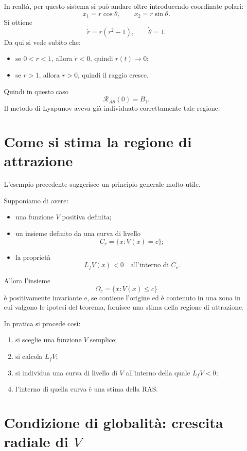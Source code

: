 In realtà, per questo sistema si può andare oltre introducendo coordinate polari:
\[
x_1=r\cos\theta,
\qquad
x_2=r\sin\theta.
\]
Si ottiene
\[
\dot r = r(r^2-1),
\qquad
\dot\theta = 1.
\]
Da qui si vede subito che:
\begin{itemize}
    \item se \(0<r<1\), allora \(\dot r<0\), quindi \(r(t)\to 0\);
    \item se \(r>1\), allora \(\dot r>0\), quindi il raggio cresce.
\end{itemize}
Quindi in questo caso
\[
\mathcal{R}_{AS}(0)=B_1.
\]
Il metodo di Lyapunov aveva già individuato correttamente tale regione.

\section{Come si stima la regione di attrazione}

L'esempio precedente suggerisce un principio generale molto utile.

Supponiamo di avere:
\begin{itemize}
    \item una funzione \(V\) positiva definita;
    \item un insieme definito da una curva di livello
    \[
    C_c=\{x:V(x)=c\};
    \]
    \item la proprietà
    \[
    L_fV(x)<0
    \quad \text{all'interno di } C_c.
    \]
\end{itemize}

Allora l'insieme
\[
\Omega_c=\{x:V(x)\le c\}
\]
è positivamente invariante e, se contiene l'origine ed è contenuto in una zona in cui valgono le ipotesi del teorema, fornisce una stima della regione di attrazione.

\medskip

\noindent
In pratica si procede così:
\begin{enumerate}
    \item si sceglie una funzione \(V\) semplice;
    \item si calcola \(L_fV\);
    \item si individua una curva di livello di \(V\) all'interno della quale \(L_fV<0\);
    \item l'interno di quella curva è una stima della RAS.
\end{enumerate}

\section{Condizione di globalità: crescita radiale di \(V\)}

